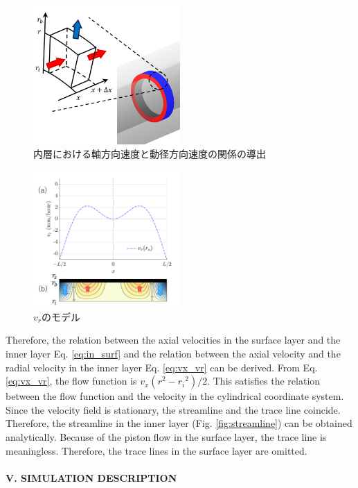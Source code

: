 \documentclass[prl,twocolumn,superscriptaddress]{revtex4}
\begin{document}
\begin{figure}[tb]
	\centering
	\includegraphics[width=0.5\textwidth]{figure/vx_vr_inner4.png}
	\caption{内層における軸方向速度と動径方向速度の関係の導出}
	\label{fig:vx_and_vr}
\end{figure}
\begin{figure}[tb]
	\centering
	\includegraphics[width=0.5\textwidth]{figure/model_vr.png}
	\caption{$v_r$のモデル}
	\label{fig:model_vr}
\end{figure}

Therefore, the relation between the axial velocities in the surface layer and the inner layer Eq. \ref{eq:in_surf} and the relation between the axial velocity and the radial velocity in the inner layer Eq. \ref{eq:vx_vr} can be derived. From Eq. \ref{eq:vx_vr}, the flow function is $v_x(r^2-{r_i}^2)/2$. This satisfies the relation between the flow function and the velocity in the cylindrical coordinate system. Since the velocity field is stationary, the streamline and the trace line coincide. Therefore, the streamline in the inner layer (Fig. \ref{fig:streamline}) can be obtained analytically. Because of the piston flow in the surface layer, the trace line is meaningless. Therefore, the trace lines in the surface layer are omitted. \\
\\
{\bf V. SIMULATION DESCRIPTION} \\
\end{document}
